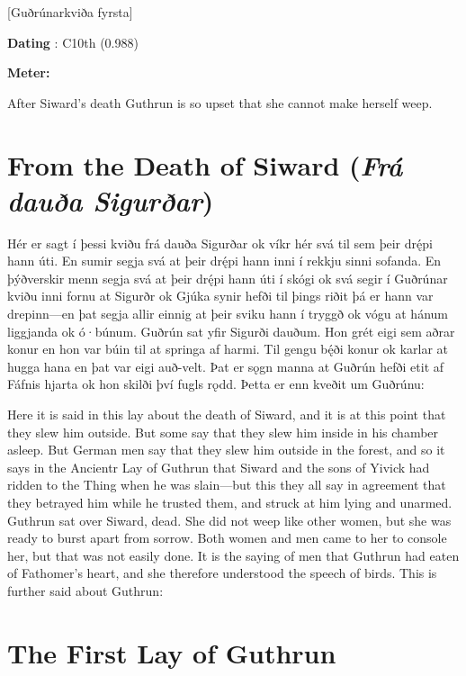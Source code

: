 [Guðrúnarkviða fyrsta]

\begin{flushright}%
\textbf{Dating} \parencite{Sapp2022}: C10th (0.988)

\textbf{Meter:} \Fornyrdislag%
\end{flushright}

After Siward’s death Guthrun is so upset that she cannot make herself weep.

\sectionline

\section{From the Death of Siward (\emph{Frá dauða Sigurðar})}

\bpg\bpa Hér er sagt í þessi kviðu frá dauða Sigurðar ok víkr hér svá til sem þeir drę́pi hann úti. En sumir segja svá at þeir drę́pi hann inni í rekkju sinni sofanda. En þýðverskir menn segja svá at þeir drę́pi hann úti í skógi ok svá segir í Guðrúnar kviðu inni fornu at Sigurðr ok Gjúka synir hefði til þings riðit þá er hann var drepinn—en þat segja allir einnig at þeir sviku hann í tryggð ok vógu at hánum liggjanda ok ó·búnum.
Guðrún sat yfir Sigurði dauðum. Hon grét eigi sem aðrar konur en hon var búin til at springa af harmi. Til gengu bę́ði konur ok karlar at hugga hana en þat var eigi auð-velt. Þat er sǫgn manna at Guðrún hefði etit af Fáfnis hjarta ok hon skilði því fugls rǫdd. Þetta er enn kveðit um Guðrúnu:\epa

\bpb Here it is said in this lay about the death of Siward, and it is at this point that they slew him outside. But some say that they slew him inside in his chamber asleep. But German men say that they slew him outside in the forest, and so it says in the Ancientr Lay of Guthrun that Siward and the sons of Yivick had ridden to the Thing when he was slain—but this they all say in agreement that they betrayed him while he trusted them, and struck at him lying and unarmed.
Guthrun sat over Siward, dead. She did not weep like other women, but she was ready to burst apart from sorrow. Both women and men came to her to console her, but that was not easily done. It is the saying of men that Guthrun had eaten of Fathomer’s heart, and she therefore understood the speech of birds. This is further said about Guthrun:\epb\epg


\section{The First Lay of Guthrun}

